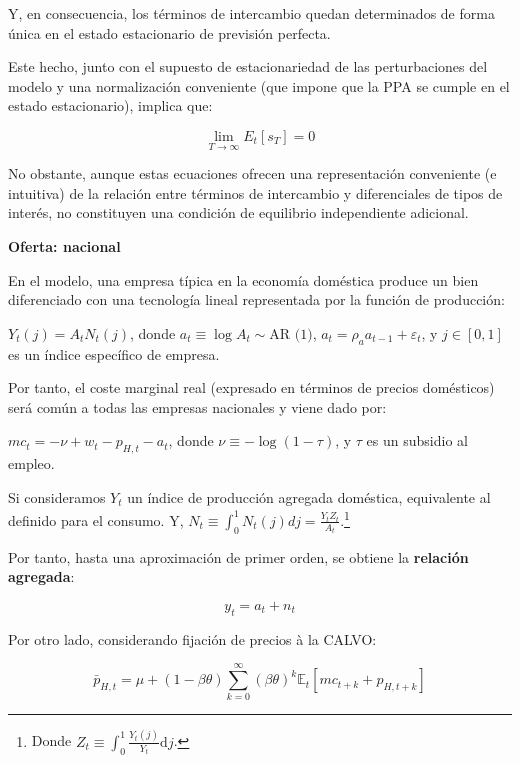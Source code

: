\documentclass[10pt,a4paper]{article}
\begin{document}
Y, en consecuencia, los términos de intercambio quedan determinados de forma única en el estado estacionario de previsión perfecta. 

Este hecho, junto con el supuesto de estacionariedad de las perturbaciones del modelo y una normalización conveniente (que impone que la PPA se cumple en el estado estacionario), implica que:

$$\lim_{T\to\infty} E_t[s_T]=0$$ 

No obstante, aunque estas ecuaciones ofrecen una representación conveniente (e intuitiva) de la relación entre términos de intercambio y diferenciales de tipos de interés, no constituyen una condición de equilibrio independiente adicional.

\textbf{Oferta: nacional}

En el modelo, una empresa típica en la economía doméstica produce un bien diferenciado con una tecnología lineal representada por la función de producción: 

$Y_t(j)=A_t N_t(j)$, donde $a_t \equiv \log A_t\sim \text{AR (1)}$, $a_t=\rho_a a_{t-1}+\varepsilon_t$, y $j \in [0,1]$ es un índice específico de empresa.

Por tanto, el coste marginal real (expresado en términos de precios domésticos) será común a todas las empresas nacionales y viene dado por:

$mc_t = -\nu + w_t - p_{H,t} - a_t$, donde $\nu \equiv -\log(1-\tau)$, y $\tau$ es un subsidio al empleo.

Si consideramos $Y_t$ un índice de producción agregada doméstica, equivalente al definido para el consumo. Y, $N_t \equiv \int_0^1 N_t(j) dj = \frac{Y_t Z_t}{A_t}$.\footnote{%
Donde $Z_t \equiv \int_0^1 \frac{Y_t(j)}{Y_t} \mathrm dj$.
}

Por tanto, hasta una aproximación de primer orden, se obtiene la \textbf{relación agregada}: 

$$y_t = a_t + n_t$$

Por otro lado, considerando fijación de precios à la CALVO: 

$$\bar p_{H,t} = \mu + (1-\beta\theta)\sum_{k=0}^{\infty}(\beta\theta)^k\mathbb E_t[mc_{t+k} + p_{H,t+k}]$$
\end{document}
